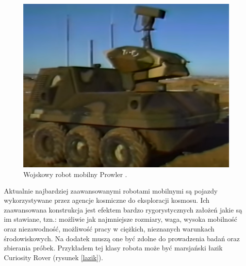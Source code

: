   \begin{figure}[H]
    \begin{center}
      \includegraphics[scale=0.4]{imgs/state.png}
 \caption[Pojaz wojskowy \textit{Prowler}]{\small{Wojskowy robot mobilny Prowler .}\footnotemark}
        \label{state}
    \end{center}
  \end{figure}

Aktualnie najbardziej zaawansowanymi robotami mobilnymi są pojazdy wykorzystywane przez agencje kosmiczne do eksploracji kosmosu. Ich zaawansowana konstrukcja jest efektem bardzo rygorystycznych założeń jakie są im stawiane, tzn.: możliwie jak najmniejsze rozmiary, waga, wysoka mobilność oraz niezawodność, możliwość pracy w ciężkich, nieznanych warunkach środowiskowych. Na dodatek muszą one być zdolne do prowadzenia badań oraz zbierania próbek. Przykładem tej klasy robota może być marsjański łazik Curiosity Rover (rysunek \ref{lazik}).

